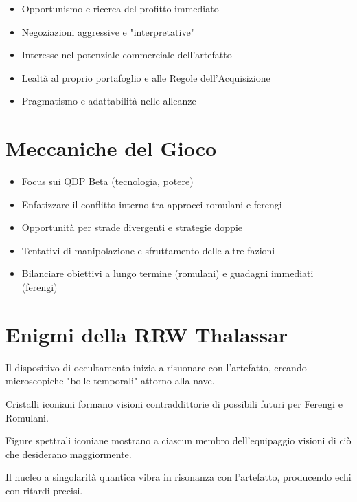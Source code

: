 \documentclass[11pt,a4paper]{article}
\begin{document}
\begin{tcolorbox}[colback=ferengigold!20, colframe=ferengigold, title=\textbf{Approccio Ferengi}]
\begin{itemize}[leftmargin=*]
\item Opportunismo e ricerca del profitto immediato
\item Negoziazioni aggressive e "interpretative"
\item Interesse nel potenziale commerciale dell'artefatto
\item Lealtà al proprio portafoglio e alle Regole dell'Acquisizione
\item Pragmatismo e adattabilità nelle alleanze
\end{itemize}
\end{tcolorbox}

\section{Meccaniche del Gioco}

\begin{tcolorbox}[colback=romlightgreen!10, colframe=romgreen]
\begin{itemize}[leftmargin=*]
\item Focus sui QDP Beta (tecnologia, potere)
\item Enfatizzare il conflitto interno tra approcci romulani e ferengi
\item Opportunità per strade divergenti e strategie doppie
\item Tentativi di manipolazione e sfruttamento delle altre fazioni
\item Bilanciare obiettivi a lungo termine (romulani) e guadagni immediati (ferengi)
\end{itemize}
\end{tcolorbox}

\section{Enigmi della RRW Thalassar}

\begin{tcolorbox}[colback=romlightgreen!10, colframe=romgreen]
\begin{description}[leftmargin=*]
\item[La Risonanza dell'Occultamento] Il dispositivo di occultamento inizia a risuonare con l'artefatto, creando microscopiche "bolle temporali" attorno alla nave.
\item[Il Paradosso del Profitto] Cristalli iconiani formano visioni contraddittorie di possibili futuri per Ferengi e Romulani.
\item[Lo Specchio dei Desideri] Figure spettrali iconiane mostrano a ciascun membro dell'equipaggio visioni di ciò che desiderano maggiormente.
\item[L'Eco Quantico] Il nucleo a singolarità quantica vibra in risonanza con l'artefatto, producendo echi con ritardi precisi.
\end{description}
\end{tcolorbox}
\end{document}

